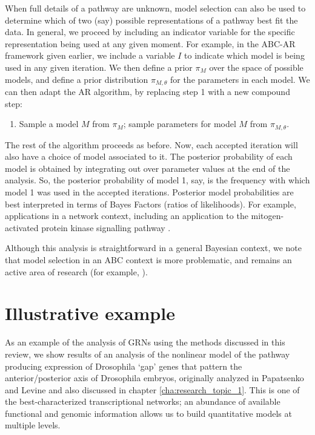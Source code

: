 When full details of a pathway are unknown, model selection can also be used to determine which of two (say) possible representations of a pathway best fit the data. In general, we proceed by including an indicator variable for the specific representation being used at any given moment. For example, in the ABC-AR framework given earlier, we include a variable $I$ to indicate which model is being used in any given iteration. We then define a prior $\pi_M$ over the space of possible models, and define a prior distribution $\pi_{M,\theta}$ for the parameters in each model. We can then adapt the AR algorithm, by replacing step 1 with a new compound step:
\begin{enumerate}
    \item Sample a model $M$ from $\pi_M$; sample parameters for model $M$ from $\pi_{M,\theta}$.
\end{enumerate}
The rest of the algorithm proceeds as before. Now, each accepted iteration will also have a choice of model associated to it. The posterior probability of each model is obtained by integrating out over parameter values at the end of the analysis. So, the posterior probability of model 1, say, is the frequency with which model 1 was used in the accepted iterations. Posterior model probabilities are best interpreted in terms of Bayes Factors (ratios of likelihoods). For example, applications in a network context, including an application to the mitogen-activated protein kinase signalling pathway \cite{Krauss2008,Toni2009a,Toni2009b, Toni2010}.

Although this analysis is straightforward in a general Bayesian context, we note that model selection in an ABC context is more problematic, and remains an active area of research (for example, \cite{Robert2011}).
\section{Illustrative example}
As an example of the analysis of GRNs using the methods discussed in this review, we show results of an analysis of the nonlinear model of the pathway producing expression of Drosophila `gap' genes that pattern the anterior/posterior axis of Drosophila embryos, originally analyzed in Papatsenko and Levine \cite{papatsenko11} and also discussed in chapter \ref{cha:research_topic_1}. This is one of the best-characterized transcriptional networks; an abundance of available functional and genomic information allows us to build quantitative models at multiple levels.

